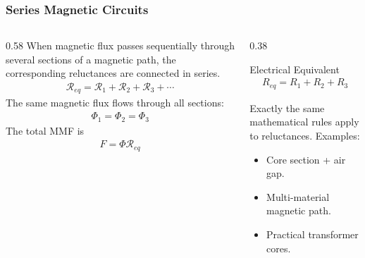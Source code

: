\begin{frame} 
    \frametitle{Series Magnetic Circuits} 
    \begin{columns} 
        \begin{column}{0.58\textwidth} 
            When magnetic flux passes sequentially through several sections of a magnetic path, the corresponding reluctances are connected in series. 
            \begin{align} 
                \mathcal R_{eq} = \mathcal R_1 + \mathcal R_2 + \mathcal R_3 +\cdots 
            \end{align} 
            The same magnetic flux flows through all sections: 
            \begin{align} 
                \Phi_1=\Phi_2=\Phi_3 
            \end{align} 
            The total MMF is 
            \begin{align} 
                F=\Phi \mathcal R_{eq} 
            \end{align} 
            \vspace{0.15cm}  
        \end{column} 
        \begin{column}{0.38\textwidth} 
            \begin{block}{Electrical Equivalent} 
                \begin{align} 
                    R_{eq}=R_1+R_2+R_3 
                \end{align} 
            \end{block} 
            \vspace{0.2cm} 
            Exactly the same mathematical rules apply to reluctances. Examples: 
            \begin{itemize} 
                \item Core section + air gap. 
                \item Multi-material magnetic path. 
                \item Practical transformer cores. 
            \end{itemize}
        \end{column} 
    \end{columns} 
\end{frame}


